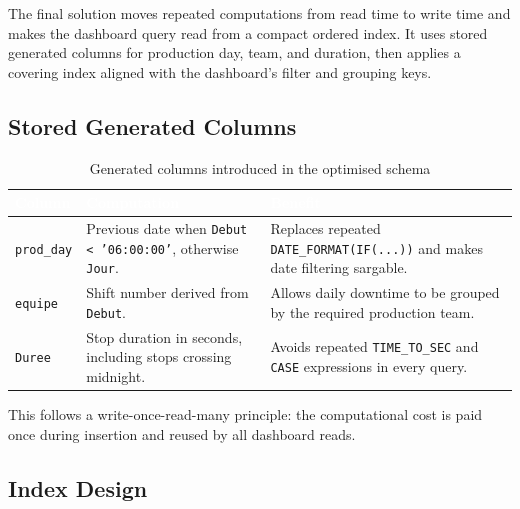 The final solution moves repeated computations from read time to write time and makes the dashboard query read from a compact ordered index. It uses stored generated columns for production day, team, and duration, then applies a covering index aligned with the dashboard's filter and grouping keys.

\subsection{Stored Generated Columns}

\begin{table}[H]
\centering
\small
\caption{Generated columns introduced in the optimised schema}
\label{tab:chapter3-5}
\setlength{\extrarowheight}{2pt}
\begin{tabular}{@{}>{\raggedright\arraybackslash}p{2.7cm}>{\raggedright\arraybackslash}p{5cm}>{\raggedright\arraybackslash}p{6.1cm}@{}}
    \toprule
    \rowcolor[HTML]{1A5490}
    \textcolor{white}{\textbf{Column}} & \textcolor{white}{\textbf{Computation}} & \textcolor{white}{\textbf{Benefit}} \\
    \midrule
    \rowcolor[HTML]{E8F4F8}
    \texttt{prod\_day} & Previous date when \texttt{Debut < '06:00:00'}, otherwise \texttt{Jour}. & Replaces repeated \texttt{DATE\_FORMAT(IF(...))} and makes date filtering sargable. \\
    \rowcolor[HTML]{FFFFFF}
    \texttt{equipe} & Shift number derived from \texttt{Debut}. & Allows daily downtime to be grouped by the required production team. \\
    \rowcolor[HTML]{E8F4F8}
    \texttt{Duree} & Stop duration in seconds, including stops crossing midnight. & Avoids repeated \texttt{TIME\_TO\_SEC} and \texttt{CASE} expressions in every query. \\
    \bottomrule
\end{tabular}
\end{table}

This follows a write-once-read-many principle: the computational cost is paid once during insertion and reused by all dashboard reads.

\subsection{Index Design}

